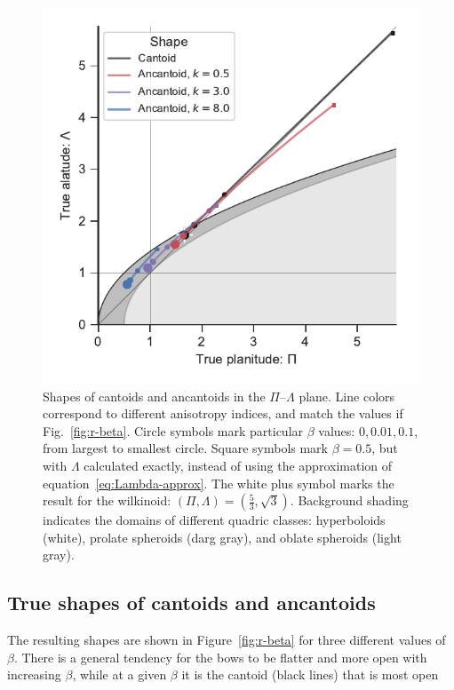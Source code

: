 \begin{figure}
  \centering
  \includegraphics[width=\linewidth]{figs/ancantoid-Pi-lambda-true}
  \caption{Shapes of cantoids and ancantoids in the
    \(\Pi\)--\(\Lambda\) plane.  Line colors correspond to different anisotropy
    indices, and match the values if Fig.~\ref{fig:r-beta}. Circle
    symbols mark particular \(\beta\) values: \(0, 0.01, 0.1\), from
    largest to smallest circle.  Square symbols mark \(\beta = 0.5\), but
    with \(\Lambda\) calculated exactly, instead of using the approximation
    of equation~\eqref{eq:Lambda-approx}.  The white plus symbol marks
    the result for the wilkinoid:
    \((\Pi, \Lambda) = (\frac53, \sqrt{3})\).  Background shading indicates
    the domains of different quadric classes: hyperboloids (white),
    prolate spheroids (darg gray), and oblate spheroids (light gray).}
  \label{fig:ancantoid-Pi-lambda-true}
\end{figure}


\subsection{True shapes of cantoids and ancantoids}
\label{sec:true-cantoids-ancantoids}

The resulting shapes are shown in
Figure~\ref{fig:r-beta} for three different values of \(\beta\).  There is
a general tendency for the bows to be flatter and more open with
increasing \(\beta\), while at a given \(\beta\) it is the cantoid (black
lines) that is most open


